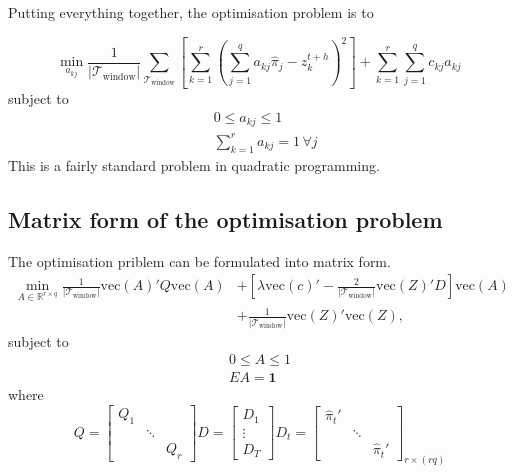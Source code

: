 \documentclass[a4paper,review,12pt,authoryear]{elsarticle}
\begin{document}
    Putting everything together, the optimisation problem is to 
    
    \[
    \underset{a_{kj}}{\min} \frac{1}{|\mathcal{T}_{\textrm{window}}|}\sum\limits_{\mathcal{T}_{\textrm{window}}}\left[\sum\limits_{k=1}^r\left(\sum\limits_{j=1}^q a_{kj}\hat{{\pi}}_j-z^{t+h}_k\right)^2\right] + \sum\limits_{k=1}^r\sum\limits_{j=1}^q c_{kj}a_{kj}\,
    \]
    subject to
    \begin{align*}
    &0\leq a_{kj}\leq 1\\
    &\sum\limits_{k=1}^r a_{kj} = 1 \,\forall j
    \end{align*}
    This is a fairly standard problem in quadratic programming.

    \subsection{Matrix form of the optimisation problem}

    The optimisation priblem can be formulated into matrix form.
    \begin{align*}
      \min\limits_{A \in \mathbb{R}^{r\times q}} \frac{1}{|\mathcal{T}_{\textrm{window}}|}\text{vec}(A)' Q \text{vec}(A) &+ \left[\lambda \text{vec}(c)' - \frac{2}{|\mathcal{T}_{\textrm{window}}|}\text{vec}(Z)'D\right]\text{vec}(A) \\&+ \frac{1}{|\mathcal{T}_{\textrm{window}}|} \text{vec}(Z)'\text{vec}(Z),
    \end{align*}
    subject to \begin{align*}
      0 \leq A \leq 1\\
      E A = \mathbf{1}
    \end{align*}
    where
    \[
    Q = \left[\begin{matrix}
      Q_1  & \\
       &\ddots \\
       &  & Q_r

    \end{matrix}  \right]
    D = \left[\begin{matrix}
      D_1 \\ \vdots \\ D_T
    \end{matrix}\right] 
    D_t = \left[\begin{matrix}
      \hat\pi_{t}' & \\
      & \ddots & \\
      & & \hat\pi_{t}'
    \end{matrix}\right]_{r\times (rq)}
    \]
\end{document}
